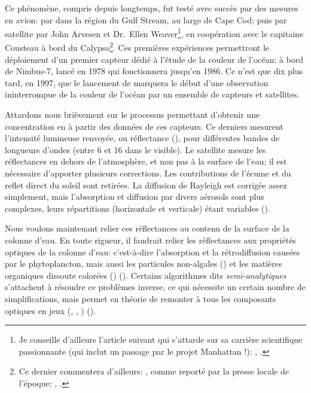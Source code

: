 Ce phénomène, compris depuis longtemps, fut testé avec succès par des mesures en avion:  par \textcite{clarke_1970} dans la région du Gulf Stream, au large de Cape Cod; puis par satellite par John Arvesen et Dr.\ Ellen Weaver\footnote{%
  Je conseille d'ailleurs l'article suivant qui s'attarde sur sa carrière scientifique passionnante (qui inclut un passage par le projet Manhattan !): , \cite{marshall_2010}.},
en coopération avec le capitaine Cousteau à bord du Calypso\footnote{%
  Ce dernier commentera d'ailleurs: , comme reporté par la presse locale de l'époque:
  , \cite{macomber_1973}.
}.
Ces premières expériences permettront le déploiement d'un premier capteur dédié à l'étude de la couleur de l'océan:  à bord de Nimbus-7, lancé en 1978 qui fonctionnera jusqu'en 1986.
Ce n'est que dix plus tard, en 1997, que le lancement de  marquera le début d'une observation ininterrompue de la couleur de l'océan par un ensemble de capteurs et satellites.

Attardons nous brièvement sur le processus permettant d'obtenir une concentration en  à partir des données de ces capteurs.
Ce derniers mesurent l'intensité lumineuse renvoyée, ou réflectance (), pour différentes bandes de longueurs d'ondes (entre 6 et 16 dans le visible).
Le satellite mesure les réflectances en dehors de l'atmosphère, et non pas à la surface de l'eau; il est nécessaire d'apporter plusieurs corrections.
Les contributions de l'écume et du reflet direct du soleil sont retirées.
La diffusion de Rayleigh est corrigée assez simplement, mais l'absorption et diffusion par divers aérosols sont plus complexes, leurs répartitions (horizontale et verticale) étant variables (\cite{werdell_2018}).

Nous voulons maintenant relier ces réflectances au contenu de la surface de la colonne d'eau.
En toute rigueur, il faudrait relier les réflectances aux propriétés optiques de la colonne d'eau: c'est-à-dire l’absorption et la rétrodiffusion causées par le phytoplancton, mais aussi les particules non-algales () et les matières organiques dissoute colorées () (\cite{werdell_2018}).
Certains algorithmes dits \emph{semi-analytiques} s'attachent à résoudre ce problèmes inverse, ce qui nécessite un certain nombre de simplifications, mais permet en théorie de remonter à tous les composants optiques en jeux (, , ) (\cite{werdell_2019}).

